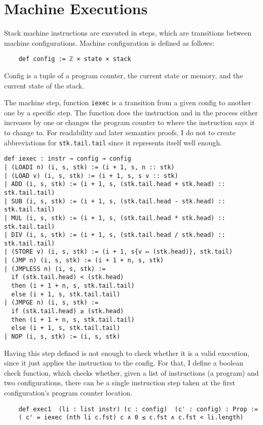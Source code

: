 \chapter{Machine Executions}\label{s:exec}

Stack machine instructions are executed in steps, which are transitions between machine configurations. Machine configuration is defined as follows:
\begin{lstlisting}
    def config := ℤ × state × stack
\end{lstlisting}
Config is a tuple of a program counter, the current state or memory, and the current state of the stack.

The machine step, function \lstinline{iexec} is a transition from a given config to another one by a specific step. The function does the instruction and in the process either increases by one or changes the program counter to where the instruction says it to change to. For readability and later semantics proofs, I do not to create abbreviations for \lstinline{stk.tail.tail} since it represents itself well enough.
\begin{lstlisting}
def iexec : instr → config → config
| (LOADI n) (i, s, stk) := (i + 1, s, n :: stk)
| (LOAD v) (i, s, stk) := (i + 1, s, s v :: stk)
| ADD (i, s, stk) := (i + 1, s, (stk.tail.head + stk.head) :: stk.tail.tail)
| SUB (i, s, stk) := (i + 1, s, (stk.tail.head - stk.head) :: stk.tail.tail)
| MUL (i, s, stk) := (i + 1, s, (stk.tail.head * stk.head) :: stk.tail.tail)
| DIV (i, s, stk) := (i + 1, s, (stk.tail.head / stk.head) :: stk.tail.tail)
| (STORE v) (i, s, stk) := (i + 1, s{v ↦ (stk.head)}, stk.tail)
| (JMP n) (i, s, stk) := (i + 1 + n, s, stk)
| (JMPLESS n) (i, s, stk) := 
  if (stk.tail.head) < (stk.head)
  then (i + 1 + n, s, stk.tail.tail)
  else (i + 1, s, stk.tail.tail)
| (JMPGE n) (i, s, stk) := 
  if (stk.tail.head) ≥ (stk.head)
  then (i + 1 + n, s, stk.tail.tail)
  else (i + 1, s, stk.tail.tail)
| NOP (i, s, stk) := (i, s, stk)
\end{lstlisting}

Having this step defined is not enough to check whether it is a valid execution, since it just applies the instruction to the config. For that, I define a boolean check function, which checks whether, given a list of instructions (a program) and two configurations, there can be a single instruction step taken at the first configuration's program counter location. 
\begin{lstlisting}
    def exec1  (li : list instr) (c : config)  (c' : config) : Prop := 
    ( c' = iexec (nth li c.fst) c ∧ 0 ≤ c.fst ∧ c.fst < li.length)  
\end{lstlisting}

